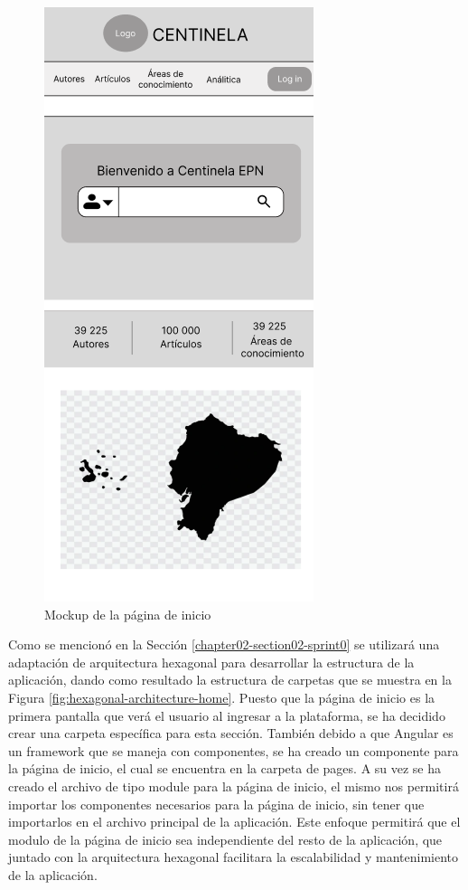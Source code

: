 \begin{figure}[H]
    \centering
    \includegraphics[scale=0.9]{../02Figures/02Chapter/Sprints/Sprint-1/mobile-first-home.png}
    \caption{Mockup de la página de inicio}
    \label{fig:mockup-home}
\end{figure}

Como se mencionó en la Sección \ref{chapter02-section02-sprint0} se utilizará una adaptación de arquitectura hexagonal para desarrollar la estructura de la aplicación, dando como resultado la estructura de carpetas que se muestra en la Figura \ref{fig:hexagonal-architecture-home}.
Puesto que la página de inicio es la primera pantalla que verá el usuario al ingresar a la plataforma, se ha decidido crear una carpeta específica para esta sección.
También debido a que Angular es un framework que se maneja con componentes, se ha creado un componente para la página de inicio, el cual se encuentra en la carpeta de pages.
A su vez  se ha creado el archivo de tipo module para la página de inicio, el mismo nos permitirá importar los componentes necesarios para la página de inicio, sin tener que importarlos en el archivo principal de la aplicación.
Este enfoque permitirá que el modulo de la página de inicio sea independiente del resto de la aplicación, que juntado con la arquitectura hexagonal facilitara la escalabilidad y mantenimiento de la aplicación.

